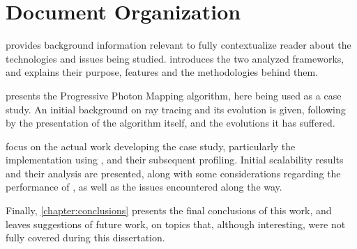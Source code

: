 \documentclass[main.tex]{subfiles}
\begin{document}
\section{Document Organization}

 provides background information relevant to fully contextualize reader about the technologies and issues being studied.  introduces the two analyzed frameworks, and explains their purpose, features and the methodologies behind them.

 presents the Progressive Photon Mapping algorithm, here being used as a case study. An initial background on ray tracing and its evolution is given, following by the presentation of the algorithm itself, and the evolutions it has suffered.

 focus on the actual work developing the case study, particularly the implementation using \starpu, and their subsequent profiling. Initial scalability results and their analysis are presented, along with some considerations regarding the performance of \starpu, as well as the issues encountered along the way.

Finally, \cref{chapter:conclusions} presents the final conclusions of this work, and leaves suggestions of future work, on topics that, although interesting, were not fully covered during this dissertation.
\end{document}
